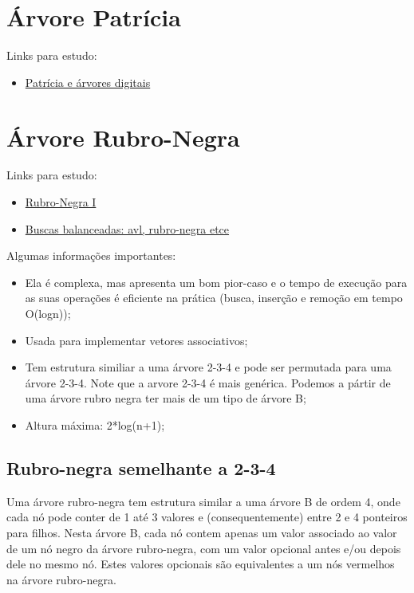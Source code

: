 \documentclass{article}
\begin{document}
\newpage

\section{Árvore Patrícia}

Links para estudo:

\begin{itemize}
	\item \href{http://www.ic.unicamp.br/~vanini/mc202/apresentacoes/ArvoreDigital.pdf}{Patrícia e
árvores digitais}
\end{itemize}

\newpage

\section{Árvore Rubro-Negra}

Links para estudo:

\begin{itemize}
	\item \href{http://www.ime.usp.br/~song/mac5710/slides/08rb.pdf}{Rubro-Negra I}
	\item
\href{http://www.ic.unicamp.br/~vanini/mc202/apresentacoes/ArvoresDe\%20BuscaBalanceadas.pdf}{Buscas
balanceadas: avl, rubro-negra etce}
\end{itemize}

Algumas informações importantes:

\begin{itemize}
	\item Ela é complexa, mas apresenta um bom pior-caso e o tempo de execução para as suas operações
é eficiente na prática (busca, inserção e remoção em tempo O(logn));
	\item Usada para implementar vetores associativos;
	\item Tem estrutura similiar a uma árvore 2-3-4 e pode ser permutada para uma árvore 2-3-4. Note
que a arvore 2-3-4 é mais genérica. Podemos a pártir de uma árvore rubro negra ter mais de um tipo
de árvore B;
	\item Altura máxima: 2*log(n+1);
\end{itemize}

\newpage

\subsection{Rubro-negra semelhante a 2-3-4}

Uma árvore rubro-negra tem estrutura similar a uma árvore B de ordem 4, onde cada nó pode conter de 1 até 3 valores e (consequentemente) entre 2 e 4 ponteiros para filhos. Nesta árvore B, cada nó contem apenas um valor associado ao valor de um nó negro da árvore rubro-negra, com um valor
opcional antes e/ou depois dele no mesmo nó. Estes valores opcionais são equivalentes a um nós
vermelhos na árvore rubro-negra.\\
\end{document}
